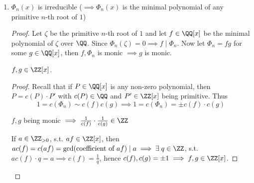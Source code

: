 \begin{proposition}
\begin{enumerate}
\begin{proof}
\begin{itemize}
				            \begin{proof}
					            Denote:
					            \[
						            \begin{aligned}
							            g & = x^m + b_1 x^{m-1} + \cdots + b_m \\
							            h & = x^n + c_1 x^{n-1} + \cdots + c_n
						            \end{aligned}
					            \]
					            See that the coefficient of \( x^{i + m + n} \) in \( f \) lies in \( R \) for
					            \( 1 \leq i \leq n \), which is actually
					            \[
						            c_i + \underbrace{c_{i-1}b_1 + \cdots + c_1 b_{i-1} + b_i}_{\in R \text{ by
								            induction on $i$, since \( b_j \in R \; \forall \; j \)}} \implies c_i \in R
					            \]
				            \end{proof}
			      \end{itemize}
		      \end{proof}
		\item \( \Phi_n(x) \) is irreducible ($\implies \Phi_n(x)$ is the minimal polynomial of any
		      primitive \( n \)-th root of \( 1 \))
		      \begin{proof}
			      Let \( \zeta \) be the primitive \( n \)-th root of \( 1 \) and let \( f\in \QQ[x] \) be
			      the minimal polynomial of \( \zeta \) over \( \QQ \). Since \( \Phi_n(\zeta) = 0
			      \implies f \mid \Phi_n \). Now let \( \Phi_n = f g \) for some \( g \in \QQ[x] \), then
			      \( f, \Phi_n \) is monic \( \implies g \) is monic.
			      \begin{claim}
				      \( f,g \in \ZZ[x] \).
			      \end{claim}
			      \begin{proof}
				      Recall that if \( P \in \QQ[x] \) is any non-zero polynomial, then \( P = c(P) \cdot P' \) with
				      \( c(P) \in \QQ \) and \( P' \in \ZZ[x] \) being primitive. Thus
				      \[
					      1 = c(\Phi_n) \sim c(f) c(g) \implies 1 = c(\Phi_n) = \pm  c(f) \cdot c(g)
				      \]
				      \begin{note}
					      \( f,g \) being monic \( \implies \frac{1}{c(f)} \cdot \frac{1}{c(g)} \in \ZZ \)
				      \end{note}
				      If \( a \in \ZZ_{>0} \), s.t. \( a f \in \ZZ[x] \), then \( ac(f) = c(af) =
				      \gcd(\text{coefficient of } af) \mid a \implies \exists \; q \in \ZZ \), s.t. \( a c(f) \cdot q = a \implies
				      c(f) = \frac{1}{q}\), hence \( c(f), c(g) = \pm 1 \implies f,g \in \ZZ[x] \).
			      \end{proof}


\end{proof}
\end{enumerate}
\end{proposition}
